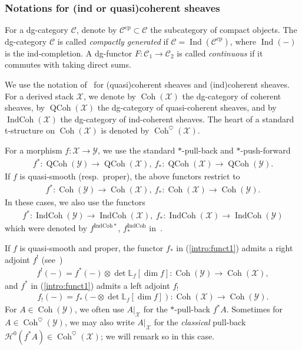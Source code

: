 \documentclass[11pt,oneside,a4paper,mathscr]{amsart}
\theoremstyle{definition}
\newcommand{\Y}{\mathcal{Y}}
\newcommand{\QCoh}{\operatorname{QCoh}}
\newcommand{\X}{\mathcal{X}}
\newcommand{\cH}{\mathcal{H}}
\newcommand{\cC}{\mathcal{C}}
\newcommand{\Coh}{\operatorname{Coh}}
\newcommand{\Ind}{\operatorname{Ind}}
\newcommand{\IndCoh}{\operatorname{IndCoh}}
\begin{document}
\subsubsection*{Notations for (ind or quasi)coherent sheaves}\label{subsec:notation}
For a dg-category $\cC$, denote by $\cC^{\mathrm{cp}} \subset \cC$ the subcategory of compact objects. The dg-category $\cC$ is called \textit{compactly generated} if $\cC=\Ind(\cC^{\mathrm{cp}})$, where $\Ind(-)$ is the ind-completion. 
A dg-functor $F \colon \cC_1 \to \cC_2$ is called \textit{continuous} 
if it commutes with taking direct sums. 

We use the notation of~\cite{MR3701352} for (quasi)coherent sheaves and (ind)coherent sheaves. 
For a derived stack $\X$, we denote by 
$\Coh(\X)$ the dg-category of coherent sheaves,
by $\QCoh(\X)$ the dg-category of quasi-coherent sheaves,
and by $\IndCoh(\X)$ the dg-category of ind-coherent sheaves. 
The heart of a standard t-structure on $\Coh(\X)$ is denoted by 
$\Coh^{\heartsuit}(\X)$. 

For a morphism $f\colon \X \to \Y$, we use the standard $*$-pull-back and $*$-push-forward
\begin{align*}
    f^* \colon \QCoh(\Y) \to \QCoh(\X), \ f_{*} \colon \QCoh(\X) \to \QCoh(\Y).
\end{align*}
If $f$ is quasi-smooth (resp.\ proper), the above functors restrict to 
\begin{align}\label{intro:funct1}
    f^* \colon \Coh(\Y) \to \Coh(\X), \ f_{*} \colon \Coh(\X) \to \Coh(\Y).
\end{align}
In these cases, we also use the functors 
\begin{align*}
        f^* \colon \IndCoh(\Y) \to \IndCoh(\X), \ f_{*} \colon \IndCoh(\X) \to \IndCoh(\Y)
\end{align*}
which were denoted by $f^{\mathrm{IndCoh}*}$, $f_{*}^{\mathrm{IndCoh}}$ in~\cite{MR3701352}. 

If $f$ is quasi-smooth and proper, the functor $f_{*}$ in (\ref{intro:funct1}) admits a right adjoint $f^!$ (see~\cite[Proposition~7.3.8]{MR3136100})
\begin{align*}
    f^!(-)=f^*(-)\otimes \det \mathbb{L}_f [\dim f]\colon \Coh(\mathcal{Y}) \to \Coh(\mathcal{X}), 
    \end{align*}
and 
$f^*$ in (\ref{intro:funct1}) admits a left adjoint $f_{!}$
\begin{align*}
    f_{!}(-)=f_{*}(- \otimes \det \mathbb{L}_f[\dim f]) \colon \Coh(\mathcal{X}) \to \Coh(\mathcal{Y}).
\end{align*}
For $A\in \Coh(\Y)$, we often use $A|_{\X}$ for the $*$-pull-back $f^*A$.
Sometimes for $A\in \Coh^{\heartsuit}(\Y)$, we may also write $A|_{\X}$ for the \textit{classical} pull-back $\cH^0(f^*A)\in \Coh^{\heartsuit}(\X)$; we will remark so in this case. 
\end{document}
